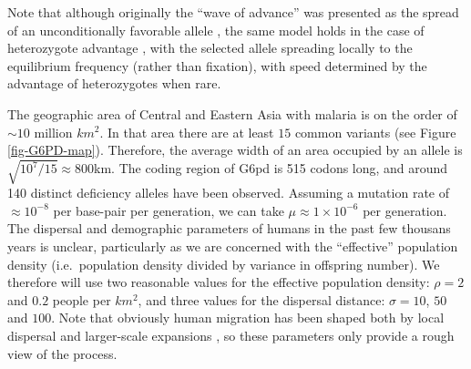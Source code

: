 \documentclass{article}
\begin{document}
Note that although originally the ``wave of advance'' was presented as the spread of an unconditionally favorable allele
\citep{fisher1936,KPP},
the same model holds in the case of heterozygote advantage \citep{aronson1975nonlinear}, 
with the selected allele spreading locally to the equilibrium frequency (rather than fixation),
with speed determined by the advantage of heterozygotes when rare.





The geographic area of Central and Eastern Asia with malaria is on the
order of $\sim 10$ million $km^2$. In that area there are at least $15$
common variants \citep{Howes-g6pd-variants} (see Figure \ref{fig-G6PD-map}). 
Therefore, the average width of an area occupied by an allele is $\sqrt{10^7/15} \approx  800$km. 
The coding region of G6pd is 515 codons long, 
and around 140 distinct deficiency alleles have been observed. 
Assuming a mutation rate of $\approx 10^{-8}$ per base-pair per generation, 
we can take $\mu \approx 1 \times 10^{-6}$ per generation. 
The dispersal and demographic parameters of humans in the past few thousans years is unclear,
particularly as we are concerned with the ``effective'' population density
(i.e.\ population density divided by variance in offspring number).
We therefore will use two reasonable values for the effective population density: $\rho=2$ and $0.2$ people per $km^2$,
and three values for the dispersal distance: $\sigma=10$, $50$ and $100$.
Note that obviously human migration has been shaped both by local dispersal and larger-scale expansions 
\citep[see ][for a recent discussion]{}, 
so these parameters only provide a rough view of the process.
\end{document}

